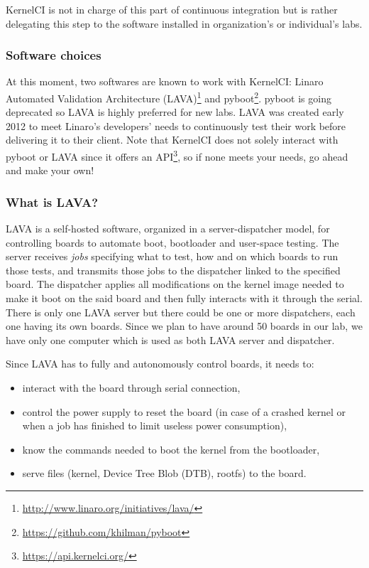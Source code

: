 KernelCI is not in charge of this part of continuous integration but is rather delegating this step to the software installed in organization's or individual's labs.

\subsubsection{Software choices}

At this moment, two softwares are known to work with KernelCI: Linaro Automated Validation Architecture (LAVA)\footnote{\url{http://www.linaro.org/initiatives/lava/}} and pyboot\footnote{\url{https://github.com/khilman/pyboot}}. pyboot is going deprecated so LAVA is highly preferred for new labs. LAVA was created early 2012 to meet Linaro's developers' needs to continuously test their work before delivering it to their client. Note that KernelCI does not solely interact with pyboot or LAVA since it offers an API\footnote{\url{https://api.kernelci.org/}}, so if none meets your needs, go ahead and make your own!

\subsubsection{What is LAVA?}

LAVA is a self-hosted software, organized in a server-dispatcher model, for controlling boards to automate boot, bootloader and user-space testing. The server receives \textit{jobs} specifying what to test, how and on which boards to run those tests, and transmits those jobs to the dispatcher linked to the specified board. The dispatcher applies all modifications on the kernel image needed to make it boot on the said board and then fully interacts with it through the serial. There is only one LAVA server but there could be one or more dispatchers, each one having its own boards. Since we plan to have around 50 boards in our lab, we have only one computer which is used as both LAVA server and dispatcher.

Since LAVA has to fully and autonomously control boards, it needs to:
\begin{itemize}
  \item interact with the board through serial connection,
  \item control the power supply to reset the board (in case of a crashed kernel or when a job has finished to limit useless power consumption),
  \item know the commands needed to boot the kernel from the bootloader,
  \item serve files (kernel, Device Tree Blob (DTB), rootfs) to the board.
\end{itemize}

